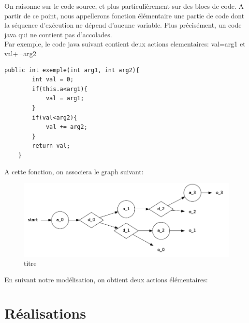 \documentclass[a4paper]{report}
\begin{document}
On raisonne sur le code source, et plus particulièrement sur des blocs de code. A partir de ce point, nous appellerons fonction élémentaire une partie de code dont la séquence d'exécution ne dépend d'aucune variable. Plus précisément, un code java qui ne contient pas d'accolades.\\
\newline
Par exemple, le code java suivant contient deux actions elementaires: val=arg1 et val+=arg2\\

\begin{lstlisting}
public int exemple(int arg1, int arg2){
		int val = 0;
		if(this.a<arg1){
			val = arg1;
		}
		if(val<arg2){
			val += arg2;
		}
		return val;
	}
\end{lstlisting}
A cette fonction, on associera le graph suivant:\\


\begin{center}
\begin{figure}[h!]
   \caption{\label{étiquette} titre}
   \includegraphics[scale=0.3]{../graphviz/doubleStackGraph.png}
\end{figure}
\end{center}



En suivant notre modélisation, on obtient deux actions élémentaires:


\chapter*{Réalisations}
\end{document}
